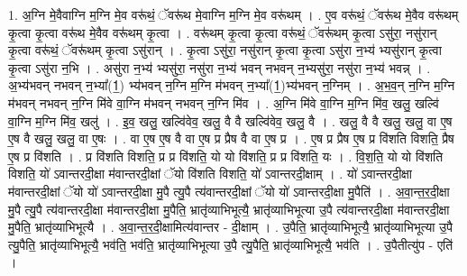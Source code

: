 \documentclass[17pt]{extarticle}
\begin{document}
1. अ॒ग्नि मे॒वैवाग्नि म॒ग्नि मे॒व वरू॑थं॒ ॅवरू॑थ मे॒वाग्नि म॒ग्नि मे॒व वरू॑थम् । . ए॒व वरू॑थं॒ ॅवरू॑थ मे॒वैव वरू॑थम् कृ॒त्वा कृ॒त्वा वरू॑थ मे॒वैव वरू॑थम् कृ॒त्वा । . वरू॑थम् कृ॒त्वा कृ॒त्वा वरू॑थं॒ ॅवरू॑थम् कृ॒त्वा ऽसु॑रा॒ नसु॑रान् कृ॒त्वा वरू॑थं॒ ॅवरू॑थम् कृ॒त्वा ऽसु॑रान् । . कृ॒त्वा ऽसु॑रा॒ नसु॑रान् कृ॒त्वा कृ॒त्वा ऽसु॑रा न॒भ्य॑ भ्यसु॑रान् कृ॒त्वा कृ॒त्वा ऽसु॑रा न॒भि । . असु॑रा न॒भ्य॑ भ्यसु॑रा॒ नसु॑रा न॒भ्य॑ भवन् नभवन् न॒भ्यसु॑रा॒ नसु॑रा न॒भ्य॑ भवन्न् । . अ॒भ्य॑भवन् नभवन् न॒भ्या᳚(1॒) भ्य॑भवन् न॒ग्नि म॒ग्नि म॑भवन् न॒भ्या᳚(1॒)भ्य॑भवन् न॒ग्निम् । . अ॒भ॒व॒न् न॒ग्नि म॒ग्नि म॑भवन् नभवन् न॒ग्नि मि॑वे वा॒ग्नि म॑भवन् नभवन् न॒ग्नि मि॑व । . अ॒ग्नि मि॑वे वा॒ग्नि म॒ग्नि मि॑व॒ खलु॒ खल्वि॑ वा॒ग्नि म॒ग्नि मि॑व॒ खलु॑ । . इ॒व॒ खलु॒ खल्वि॑वेव॒ खलु॒ वै वै खल्वि॑वेव॒ खलु॒ वै । . खलु॒ वै वै खलु॒ खलु॒ वा ए॒ष ए॒ष वै खलु॒ खलु॒ वा ए॒षः । . वा ए॒ष ए॒ष वै वा ए॒ष प्र प्रैष वै वा ए॒ष प्र । . ए॒ष प्र प्रैष ए॒ष प्र वि॑शति विशति॒ प्रैष ए॒ष प्र वि॑शति । . प्र वि॑शति विशति॒ प्र प्र वि॑शति॒ यो यो वि॑शति॒ प्र प्र वि॑शति॒ यः । . वि॒श॒ति॒ यो यो वि॑शति विशति॒ यो॑ ऽवान्तरदी॒क्षा म॑वान्तरदी॒क्षां ॅयो वि॑शति विशति॒ यो॑ ऽवान्तरदी॒क्षाम् । . यो॑ ऽवान्तरदी॒क्षा म॑वान्तरदी॒क्षां ॅयो यो॑ ऽवान्तरदी॒क्षा मु॒पै त्यु॒पै त्य॑वान्तरदी॒क्षां ॅयो यो॑ ऽवान्तरदी॒क्षा मु॒पैति॑ । . अ॒वा॒न्त॒र॒दी॒क्षा मु॒पै त्यु॒पै त्य॑वान्तरदी॒क्षा म॑वान्तरदी॒क्षा मु॒पैति॒ भ्रातृ॑व्याभिभूत्यै॒ भ्रातृ॑व्याभिभूत्या उ॒पै त्य॑वान्तरदी॒क्षा म॑वान्तरदी॒क्षा मु॒पैति॒ भ्रातृ॑व्याभिभूत्यै । . अ॒वा॒न्त॒र॒दी॒क्षामित्य॑वान्तर - दी॒क्षाम् । . उ॒पैति॒ भ्रातृ॑व्याभिभूत्यै॒ भ्रातृ॑व्याभिभूत्या उ॒पै त्यु॒पैति॒ भ्रातृ॑व्याभिभूत्यै॒ भव॑ति॒ भव॑ति॒ भ्रातृ॑व्याभिभूत्या उ॒पै त्यु॒पैति॒ भ्रातृ॑व्याभिभूत्यै॒ भव॑ति । . उ॒पैतीत्यु॑प - एति॑ । \newline
\end{document}
